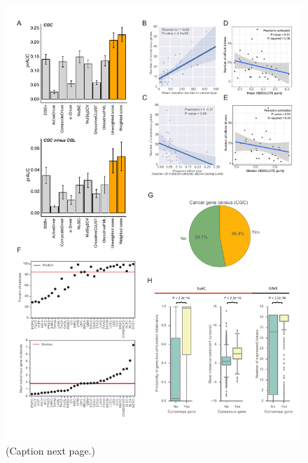 \begin{figure}
  \centering
  \makeatletter
  \let\@currsize\normalsize
  \includegraphics[width=0.9\linewidth]{figures/chapter7/analysis_of_cancer_driver_genes.pdf}
  \caption[Characteristics of consensus genes.]{(Caption next page.)}
  \label{fig:gene_characteristics}
\end{figure}
\addtocounter{figure}{-1}
